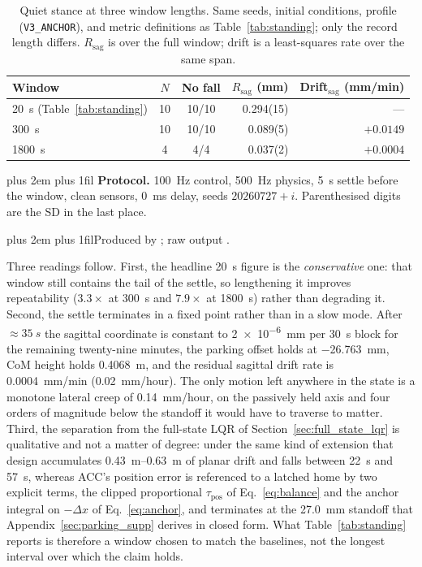 \documentclass[a4paper,fleqn]{cas-dc}
\newcommand{\tabnote}{\par\leftskip=0pt\rightskip=0pt plus 2em%
  \parfillskip=0pt plus 1fil\relax}
\begin{document}
\begin{table}[pos=t]
\centering
\caption{Quiet stance at three window lengths. Same seeds, initial conditions,
profile (\texttt{V3\_ANCHOR}), and metric definitions as
Table~\ref{tab:standing}; only the record length differs. $R_{\text{sag}}$ is
over the full window; drift is a least-squares rate over the same span.}
\label{tab:longhorizon}
\setlength{\tabcolsep}{4pt}
\footnotesize
\begin{tabular}{@{}lccrr@{}}
\toprule
Window & $N$ & No fall & $R_{\text{sag}}$ (mm) & Drift$_{\text{sag}}$ (mm/min) \\
\midrule
\SI{20}{s} (Table~\ref{tab:standing}) & 10 & 10/10 & 0.294(15) & --- \\
\SI{300}{s}  & 10 & 10/10 & 0.089(5) & $+0.0149$ \\
\SI{1800}{s} & \phantom{0}4 & \phantom{0}4/4 & 0.037(2) & $+0.0004$ \\
\bottomrule
\end{tabular}
\vspace{2pt}\tabnote\noindent
\textbf{Protocol.} \SI{100}{Hz} control, \SI{500}{Hz} physics, \SI{5}{s} settle
before the window, clean sensors, \SI{0}{ms} delay, seeds $20260727{+}i$.
Parenthesised digits are the SD in the last place.
\tabnote\noindent Produced by ; raw output
.
\end{table}

Three readings follow. First, the headline \SI{20}{s} figure is the
\emph{conservative} one: that window still contains the tail of the settle, so
lengthening it improves repeatability ($3.3{\times}$ at \SI{300}{s} and
$7.9{\times}$ at \SI{1800}{s}) rather than degrading it. Second, the settle
terminates in a fixed point rather than in a slow mode. After
${\approx}\SI{35}{s}$ the sagittal coordinate is constant to
\SI{2e-6}{mm} per \SI{30}{s} block for the remaining twenty-nine minutes, the
parking offset holds at \SI{-26.763}{mm}, CoM height holds \SI{0.4068}{m}, and
the residual sagittal drift rate is \SI{0.0004}{mm/min}
(\SI{0.02}{mm/hour}). The only motion left anywhere in the state is a monotone
lateral creep of \SI{0.14}{mm/hour}, on the passively held axis and four orders
of magnitude below the standoff it would have to traverse to matter. Third, the
separation from the full-state LQR of Section~\ref{sec:full_state_lqr} is
qualitative and not a matter of degree: under the same kind of extension that
design accumulates \SIrange{0.43}{0.63}{m} of planar drift and falls between
\SI{22}{s} and \SI{57}{s}, whereas ACC's position error is referenced to a
latched home by two explicit terms, the clipped proportional
$\tau_{\text{pos}}$ of Eq.~\eqref{eq:balance} and the anchor integral on
$-\Delta x$ of Eq.~\eqref{eq:anchor}, and terminates at the
\SI{27.0}{mm} standoff that Appendix~\ref{sec:parking_supp} derives in closed
form. What Table~\ref{tab:standing} reports is therefore a window chosen to
match the baselines, not the longest interval over which the claim holds.
\end{document}
